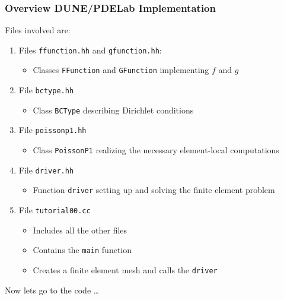 \documentclass[ignorenonframetext,11pt]{beamer}
\theoremstyle{definition}
\begin{document}
\begin{frame}
\frametitle{Overview DUNE/PDELab Implementation}
Files involved are:
\begin{enumerate}[1)]
\item Files \lstinline{ffunction.hh} and \lstinline{gfunction.hh}:
\begin{itemize}
\item Classes \lstinline{FFunction} and \lstinline{GFunction} 
implementing $f$ and $g$
\end{itemize}
\item File \lstinline{bctype.hh}
\begin{itemize}
\item Class \lstinline{BCType} describing Dirichlet conditions
\end{itemize}
\item File \lstinline{poissonp1.hh} 
\begin{itemize}
\item Class \lstinline{PoissonP1} 
realizing the necessary element-local computations
\end{itemize}
\item File \lstinline{driver.hh}
\begin{itemize}
\item Function \lstinline{driver} setting up and solving the finite element problem
\end{itemize}
\item File \lstinline{tutorial00.cc} 
\begin{itemize}
\item Includes all the other files 
\item Contains the \lstinline{main} function
\item Creates a finite element mesh and calls the \lstinline{driver}
\end{itemize}
\end{enumerate}
Now lets go to the code \ldots
\end{frame}
\end{document}
